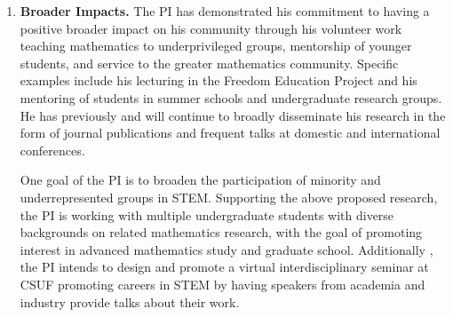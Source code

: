 \documentclass[11pt,letterpaper]{article}
\theoremstyle{definition}
\begin{document}
\begin{enumerate}[(1)]
\item{\textbf{Broader Impacts.}}
The PI has demonstrated his commitment to having a positive broader impact on his community through his volunteer work teaching mathematics to underprivileged groups, mentorship of younger students, and service to the greater mathematics community.
Specific examples include his lecturing in the Freedom Education Project and his mentoring of students in summer schools and undergraduate research groups.
He has previously and will continue to broadly disseminate his research in the form of journal publications and frequent talks at domestic and international conferences.

One goal of the PI is to broaden the participation of minority and underrepresented groups in STEM.  Supporting the above proposed research, the PI is working with multiple undergraduate students with diverse backgrounds on related mathematics research, with the goal of promoting interest in advanced mathematics study and graduate school.
Additionally , the PI intends to design and promote a virtual interdisciplinary seminar at CSUF promoting careers in STEM by having speakers from academia and industry provide talks about their work.
\end{enumerate}
\end{document}
